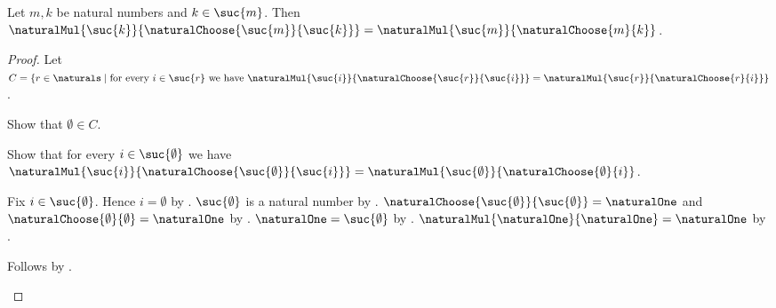 \begin{theorem}\label{natural_choose_weighted}
    Let $m,k$ be natural numbers and $k\in\suc{m}$.
    Then
        $\naturalMul{\suc{k}}{\naturalChoose{\suc{m}}{\suc{k}}}
            =\naturalMul{\suc{m}}{\naturalChoose{m}{k}}$.
\end{theorem}
\begin{proof}
    Let $C=\{r\in\naturals\mid
        \text{for every $i\in\suc{r}$ we have
            $\naturalMul{\suc{i}}{
                \naturalChoose{\suc{r}}{\suc{i}}}
                =\naturalMul{\suc{r}}{\naturalChoose{r}{i}}$}\}$.

    Show that $\emptyset\in C$.
    \begin{subproof}
        Show that for every $i\in\suc{\emptyset}$ we have
            $\naturalMul{\suc{i}}{
                \naturalChoose{\suc{\emptyset}}{\suc{i}}}
                =\naturalMul{\suc{\emptyset}}{
                    \naturalChoose{\emptyset}{i}}$.
        \begin{subproof}
            Fix $i\in\suc{\emptyset}$.
            Hence $i=\emptyset$ by .
            $\suc{\emptyset}$ is a natural number by
                .
            $\naturalChoose{\suc{\emptyset}}{\suc{\emptyset}}
                =\naturalOne$ and
                $\naturalChoose{\emptyset}{\emptyset}=\naturalOne$ by
                .
            $\naturalOne=\suc{\emptyset}$ by .
            $\naturalMul{\naturalOne}{\naturalOne}=\naturalOne$ by
                .
        \end{subproof}
        Follows by .
    \end{subproof}


\end{proof}
